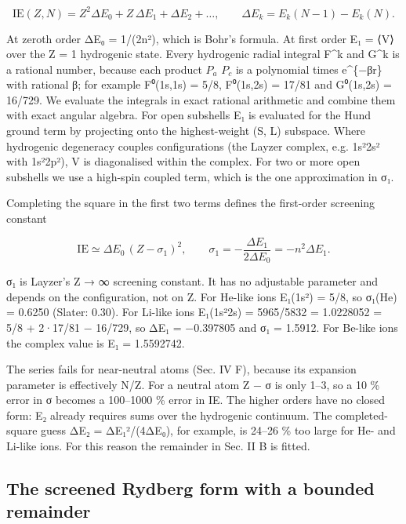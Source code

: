 \documentclass[aps,pra,preprint,notitlepage,superscriptaddress,amsmath,amssymb]{revtex4-2}
\begin{document}
\begin{equation}
\mathrm{IE}(Z,N)=Z^2\Delta E_0+Z\,\Delta E_1+\Delta E_2+\dots,\qquad \Delta E_k=E_k(N-1)-E_k(N).
\end{equation}

At zeroth order ΔE₀ = 1/(2n²), which is Bohr's formula. At first order E₁ = ⟨V⟩ over the Z = 1 hydrogenic state. Every hydrogenic radial integral F\textasciicircum{}k and G\textasciicircum{}k is a rational number, because each product $P_{a}$ $P_{c}$ is a polynomial times e\textasciicircum{}\{−βr\} with rational β; for example F⁰(1s,1s) = 5/8, F⁰(1s,2s) = 17/81 and G⁰(1s,2s) = 16/729. We evaluate the integrals in exact rational arithmetic and combine them with exact angular algebra. For open subshells E₁ is evaluated for the Hund ground term by projecting onto the highest-weight (S, L) subspace. Where hydrogenic degeneracy couples configurations (the Layzer complex, e.g. 1s²2s² with 1s²2p²), V is diagonalised within the complex. For two or more open subshells we use a high-spin coupled term, which is the one approximation in σ₁.


Completing the square in the first two terms defines the first-order screening constant


\begin{equation}
\mathrm{IE}\simeq \Delta E_0\,(Z-\sigma_1)^2,\qquad \sigma_1=-\frac{\Delta E_1}{2\Delta E_0}=-n^2\Delta E_1 .
\end{equation}

σ₁ is Layzer's Z → ∞ screening constant. It has no adjustable parameter and depends on the configuration, not on Z. For He-like ions E₁(1s²) = 5/8, so σ₁(He) = 0.6250 (Slater: 0.30). For Li-like ions E₁(1s²2s) = 5965/5832 = 1.0228052 = 5/8 + 2·17/81 − 16/729, so ΔE₁ = −0.397805 and σ₁ = 1.5912. For Be-like ions the complex value is E₁ = 1.5592742.


The series fails for near-neutral atoms (Sec. IV F), because its expansion parameter is effectively N/Z. For a neutral atom Z − σ is only 1–3, so a 10 \% error in σ becomes a 100–1000 \% error in IE. The higher orders have no closed form: E₂ already requires sums over the hydrogenic continuum. The completed-square guess ΔE₂ = ΔE₁²/(4ΔE₀), for example, is 24–26 \% too large for He- and Li-like ions. For this reason the remainder in Sec. II B is fitted.


\subsection{The screened Rydberg form with a bounded remainder}
\end{document}
